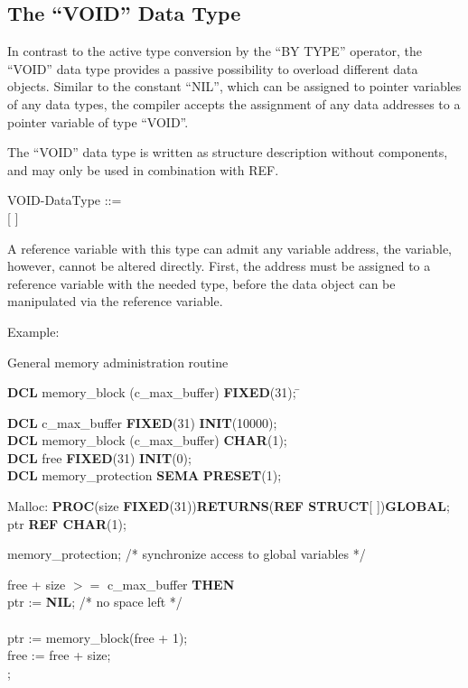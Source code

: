 \begin{removed}
\subsection{The ``VOID'' Data Type}    %

In contrast to the active type conversion by the ``BY TYPE'' operator,
the ``VOID'' data type provides a passive possibility to overload
different data objects. Similar to the constant ``NIL'', which can be
assigned to pointer variables of any data types, the compiler accepts
the assignment of any data addresses to a pointer variable of type
``VOID''.

The ``VOID'' data type is written as structure description without
components, and may only be used in combination with REF.

VOID-DataType ::=\\
 [ ]

A reference variable with this type can admit any variable address, the
variable, however, cannot be altered directly. First, the address must
be assigned to a reference variable with the needed type, before the
data object can be manipulated via the reference variable.

Example:

General memory administration routine

\begin{tabbing}
{\bf DCL} memory\_block (c\_max\_buffer) \= {\bf FIXED}(31); \= \kill

{\bf DCL} c\_max\_buffer  \> {\bf FIXED}(31)  \> {\bf INIT}(10000);\\
{\bf DCL} memory\_block (c\_max\_buffer) \> {\bf CHAR}(1);   \> \\
{\bf DCL} free                           \> {\bf FIXED}(31)  \> {\bf INIT}(0);\\
{\bf DCL} memory\_protection             \> {\bf SEMA}       \> {\bf PRESET}(1);
\end{tabbing}

Malloc: {\bf PROC}(size {\bf FIXED}(31)){\bf RETURNS}({\bf REF STRUCT}[ ]){\bf GLOBAL};\\
 ptr {\bf REF CHAR}(1);

 memory\_protection; \x /* synchronize access to global variables */

 free + size $>=$ c\_max\_buffer {\bf THEN}\\
\x \x ptr := {\bf NIL}; \x /* no space left */\\
 \\
\x \x ptr := memory\_block(free + 1);\\
\x \x free := free + size;\\
;


\end{removed}
